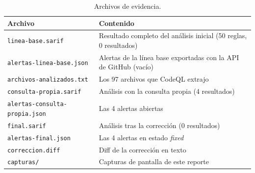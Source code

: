 \documentclass[11pt,a4paper]{article}
\newcommand{\cod}[1]{\texttt{#1}}
\begin{document}
\begin{table}[H]\centering
\caption{Archivos de evidencia.}
\begin{tabularx}{\linewidth}{@{}p{5.6cm}L@{}}
\toprule
\textbf{Archivo} & \textbf{Contenido} \\ \midrule
\cod{linea-base.sarif} & Resultado completo del análisis inicial (50 reglas, 0 resultados) \\
\cod{alertas-linea-base.json} & Alertas de la línea base exportadas con la API de GitHub (vacío) \\
\cod{archivos-analizados.txt} & Los 97 archivos que CodeQL extrajo \\
\cod{consulta-propia.sarif} & Análisis con la consulta propia (4 resultados) \\
\cod{alertas-consulta-propia.json} & Las 4 alertas abiertas \\
\cod{final.sarif} & Análisis tras la corrección (0 resultados) \\
\cod{alertas-final.json} & Las 4 alertas en estado \emph{fixed} \\
\cod{correccion.diff} & Diff de la corrección en texto \\
\cod{capturas/} & Capturas de pantalla de este reporte \\ \bottomrule
\end{tabularx}
\end{table}
\end{document}
